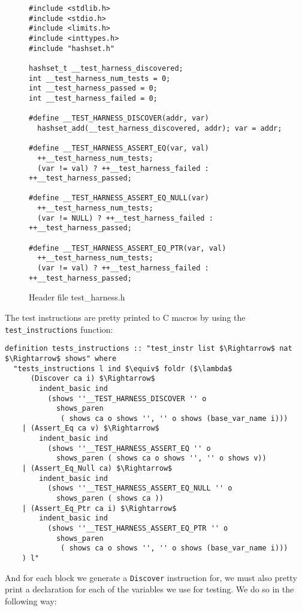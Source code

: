 \begin{figure}
\begin{lstlisting}[mathescape=true]
#include <stdlib.h>
#include <stdio.h>
#include <limits.h>
#include <inttypes.h>
#include "hashset.h"

hashset_t __test_harness_discovered;
int __test_harness_num_tests = 0;
int __test_harness_passed = 0;
int __test_harness_failed = 0;

#define __TEST_HARNESS_DISCOVER(addr, var)
  hashset_add(__test_harness_discovered, addr); var = addr;

#define __TEST_HARNESS_ASSERT_EQ(var, val)
  ++__test_harness_num_tests;
  (var != val) ? ++__test_harness_failed : ++__test_harness_passed;

#define __TEST_HARNESS_ASSERT_EQ_NULL(var)
  ++__test_harness_num_tests;
  (var != NULL) ? ++__test_harness_failed : ++__test_harness_passed;

#define __TEST_HARNESS_ASSERT_EQ_PTR(var, val)
  ++__test_harness_num_tests;
  (var != val) ? ++__test_harness_failed : ++__test_harness_passed;
\end{lstlisting}

\caption{Header file test\_harness.h}
\label{fig:header_test_harness}
\end{figure}


The test instructions are pretty printed to C macros by using the \verb|test_instructions| function:

\begin{lstlisting}[mathescape=true, frame=single]
definition tests_instructions :: "test_instr list $\Rightarrow$ nat $\Rightarrow$ shows" where
  "tests_instructions l ind $\equiv$ foldr ($\lambda$
      (Discover ca i) $\Rightarrow$
        indent_basic ind
          (shows ''__TEST_HARNESS_DISCOVER '' o
            shows_paren
             ( shows ca o shows '', '' o shows (base_var_name i)))
    | (Assert_Eq ca v) $\Rightarrow$
        indent_basic ind
          (shows ''__TEST_HARNESS_ASSERT_EQ '' o
            shows_paren ( shows ca o shows '', '' o shows v))
    | (Assert_Eq_Null ca) $\Rightarrow$
        indent_basic ind
          (shows ''__TEST_HARNESS_ASSERT_EQ_NULL '' o
            shows_paren ( shows ca ))
    | (Assert_Eq_Ptr ca i) $\Rightarrow$
        indent_basic ind
          (shows ''__TEST_HARNESS_ASSERT_EQ_PTR '' o
            shows_paren
             ( shows ca o shows '', '' o shows (base_var_name i)))
    ) l"
\end{lstlisting}


And for each block we generate a \verb|Discover| instruction for, we must also pretty print a declaration for each of the variables we use for testing.
We do so in the following way:

